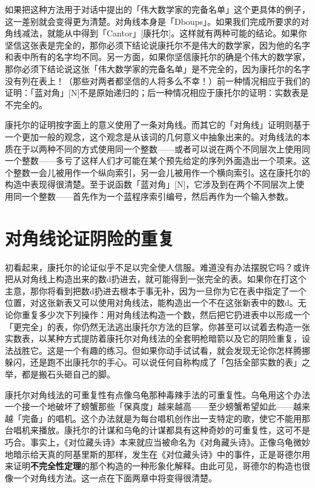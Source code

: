 \documentclass[
  12pt,
  twoside,
  openright,
  oldfontcommands,
]{memoir}
\newcommand{\heititext}[1]{{\heifamily\bfseries #1}}
\begin{document}
如果把这种方法用于对话中提出的「伟大数学家的完备名单」这个更具体的例子，这一差别就会变得更为清楚。对角线本身是「Dboups」。如果我们完成所要求的对角线减法，就能从中得到「Cantor」{[}康托尔{]}。这样就有两种可能的结论。如果你坚信这张表是完全的，那你必须下结论说康托尔不是伟大的数学家，因为他的名字和表中所有的名字均不同。另一方面，如果你坚信康托尔的确是个伟大的数学家，那你必须下结论说这张「伟大数学家的完备名单」是不完全的，因为康托尔的名字没有列在表上！（那些对两者都坚信的人将多么不幸！）前一种情况相应于我们的证明：「蓝对角」{[}N{]}不是原始递归的；后一种情况相应于康托尔的证明：实数表是不完全的。

康托尔的证明按字面上的意义使用了一条对角线。而其它的「对角线」证明则基于一个更加一般的观念，这个观念是从该词的几何意义中抽象出来的。对角线法的本质在于以两种不同的方式使用同一个整数------或者可以说在两个不同层次上使用同一个整数------多亏了这样人们才可能在某个预先给定的序列外面造出一个项来。这个整数一会儿被用作一个纵向索引，另一会儿被用作一个横向索引。这在康托尔的构造中表现得很清楚。至于说函数「蓝对角」{[}N{]}，它涉及到在两个不同层次上使用同一个整数------首先作为一个蓝程序索引编号，然后再作为一个输入参数。

\section{对角线论证阴险的重复}

初看起来，康托尔的论证似乎不足以完全使人信服。难道没有办法摆脱它吗？或许把从对角线上构造出来的数d扔进去，就可能得到一张完全的表。如果你在打这个主意，那你将看到把数d扔进去根本于事无补，因为一旦你为它在表中指定了一个位置，对这张新表又可以使用对角线法，能构造出一个不在这张新表中的数d\textquotesingle。无论你重复多少次下列操作：用对角线法构造一个数，然后把它扔进表中以形成一个「更完全」的表，你仍然无法逃出康托尔方法的巨掌。你甚至可以试着去构造一张实数表，以某种方式提防着康托尔对角线法的全套明枪暗箭以及它的阴险重复，设法战胜它。这是一个有趣的练习。但如果你动手试试看，就会发现无论你怎样腾挪躲闪，还是跑不出康托尔的手心。可以说任何自称构成了「包括全部实数的表」之举，都是搬石头砸自己的脚。

康托尔对角线法的可重复性有点像乌龟那种毒辣手法的可重复性。乌龟用这个办法一个接一个地破坏了螃蟹那些「保真度」越来越高------至少螃蟹希望如此------越来越「完备」的唱机。这个办法就是为每台唱机创作出一支特定的歌，使它不能用那台唱机来播放。康托尔的计谋和乌龟的计谋都具有这种奇妙的可重复性，这可不是巧合。事实上，《对位藏头诗》本来就应当被命名为《对角藏头诗》。正像乌龟微妙地暗示给天真的阿基里斯的那样，发生在《对位藏头诗》中的事件，正是哥德尔用来证明\heititext{不完全性定理}的那个构造的一种形象化解释。由此可见，哥德尔的构造也很像一个对角线方法。这一点在下面两章中将变得很清楚。
\end{document}
